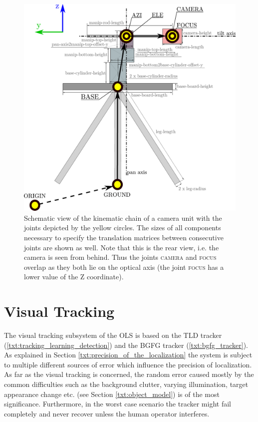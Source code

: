 \begin{figure}[htb]
	\centering
	\includegraphics[width=0.6\linewidth]{fig/camera_unit_kinematic_chain.pdf}
	\caption{Schematic view of the kinematic chain of a camera unit with the joints depicted by the yellow circles. The sizes of all components necessary to specify the translation matrices between consecutive joints are shown as well. Note that this is the rear view, i.e. the camera is seen from behind. Thus the joints \textsc{camera} and \textsc{focus} overlap as they both lie on the optical axis (the joint \textsc{focus} has a lower value of the Z coordinate).}
	\label{fig:camera_unit_kinematic_chain}
\end{figure}


\section{Visual Tracking} \label{txt:visual_tracking}

The visual tracking subsystem of the OLS is based on the TLD tracker (\ref{txt:tracking_learning_detection}) and the BGFG tracker (\ref{txt:bgfg_tracker}). As explained in Section \ref{txt:precision_of_the_localization} the system is subject to multiple different sources of error which influence the precision of localization. As far as the visual tracking is concerned, the random error caused mostly by the common difficulties such as the background clutter, varying illumination, target appearance change etc. (see Section \ref{txt:object_model}) is of the most significance. Furthermore, in the worst case scenario the tracker might fail completely and never recover unless the human operator interferes.

